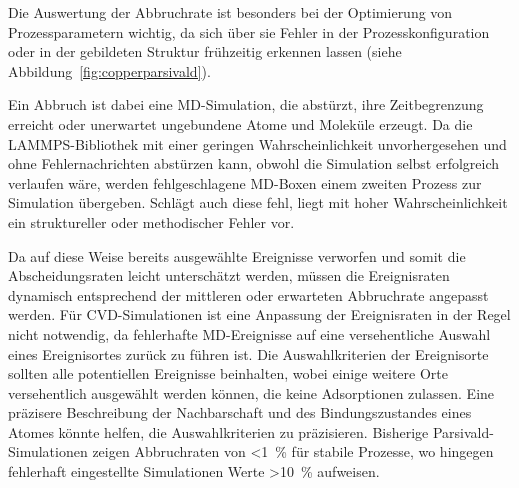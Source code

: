 Die Auswertung der Abbruchrate ist besonders bei der Optimierung von Prozessparametern wichtig, da sich über sie Fehler in der Prozesskonfiguration oder in der gebildeten Struktur frühzeitig erkennen lassen (siehe Abbildung~\ref{fig:copperparsivald}).

Ein Abbruch ist dabei eine MD-Simulation, die abstürzt, ihre Zeitbegrenzung erreicht oder unerwartet ungebundene Atome und Moleküle erzeugt.
Da die LAMMPS-Bibliothek mit einer geringen Wahrscheinlichkeit unvorhergesehen und ohne Fehlernachrichten abstürzen kann, obwohl die Simulation selbst erfolgreich verlaufen wäre, werden fehlgeschlagene MD-Boxen einem zweiten Prozess zur Simulation übergeben.
Schlägt auch diese fehl, liegt mit hoher Wahrscheinlichkeit ein struktureller oder methodischer Fehler vor.

Da auf diese Weise bereits ausgewählte Ereignisse verworfen und somit die Abscheidungsraten leicht unterschätzt werden, müssen die Ereignisraten dynamisch entsprechend der mittleren oder erwarteten Abbruchrate angepasst werden.
Für CVD-Simulationen ist eine Anpassung der Ereignisraten in der Regel nicht notwendig, da fehlerhafte MD-Ereignisse auf eine versehentliche Auswahl eines Ereignisortes zurück zu führen ist.
Die Auswahlkriterien der Ereignisorte sollten alle potentiellen Ereignisse beinhalten, wobei einige weitere Orte versehentlich ausgewählt werden können, die keine Adsorptionen zulassen.
Eine präzisere Beschreibung der Nachbarschaft und des Bindungszustandes eines Atomes könnte helfen, die Auswahlkriterien zu präzisieren.
Bisherige Parsivald-Simulationen zeigen Abbruchraten von \SI{<1}{\percent} für stabile Prozesse, wo hingegen fehlerhaft eingestellte Simulationen Werte \SI{>10}{\percent} aufweisen.
